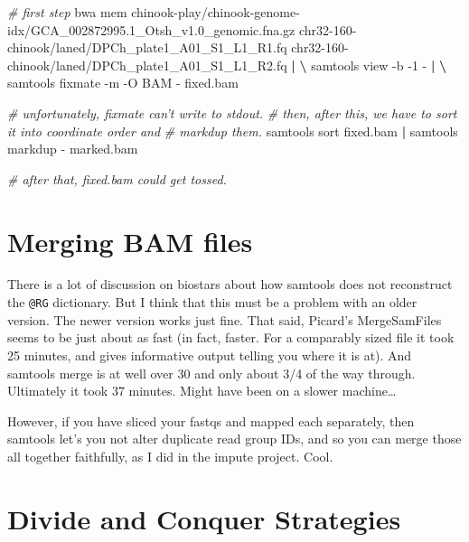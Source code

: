 \documentclass[]{krantz}
\makeatletter
\newenvironment{Shaded}{\begin{snugshade}}{\end{snugshade}}
\newcommand{\CommentTok}[1]{\textcolor[rgb]{0.37,0.37,0.37}{\textit{#1}}}
\newcommand{\ExtensionTok}[1]{#1}
\newcommand{\KeywordTok}[1]{\textcolor[rgb]{0.27,0.27,0.27}{\textbf{#1}}}
\newcommand{\NormalTok}[1]{#1}
\newenvironment{kframe}{%
\medskip{}
\setlength{\fboxsep}{.8em}
 \def\at@end@of@kframe{}%
 \ifinner\ifhmode%
  \def\at@end@of@kframe{\end{minipage}}%
  \begin{minipage}{\columnwidth}%
 \fi\fi%
 \def\FrameCommand##1{\hskip\@totalleftmargin \hskip-\fboxsep
 \colorbox{shadecolor}{##1}\hskip-\fboxsep
     \hskip-\linewidth \hskip-\@totalleftmargin \hskip\columnwidth}%
 \MakeFramed {\advance\hsize-\width
   \@totalleftmargin\z@ \linewidth\hsize
   \@setminipage}}%
 {\par\unskip\endMakeFramed%
 \at@end@of@kframe}
\renewenvironment{Shaded}{\begin{kframe}}{\end{kframe}}
\makeatother
\begin{document}
\begin{Shaded}
\begin{Highlighting}[]
\CommentTok{# first step}
\ExtensionTok{bwa}\NormalTok{ mem chinook-play/chinook-genome-idx/GCA_002872995.1_Otsh_v1.0_genomic.fna.gz chr32-160-chinook/laned/DPCh_plate1_A01_S1_L1_R1.fq chr32-160-chinook/laned/DPCh_plate1_A01_S1_L1_R2.fq }\KeywordTok{|} \KeywordTok{\textbackslash{}}
    \ExtensionTok{samtools}\NormalTok{ view -b -1 - }\KeywordTok{|} \KeywordTok{\textbackslash{}}
    \ExtensionTok{samtools}\NormalTok{ fixmate -m -O BAM - fixed.bam}
    
\CommentTok{# unfortunately, fixmate can't write to stdout.}
\CommentTok{# then, after this, we have to sort it into coordinate order and}
\CommentTok{# markdup them.}
\ExtensionTok{samtools}\NormalTok{ sort fixed.bam }\KeywordTok{|} \ExtensionTok{samtools}\NormalTok{ markdup - marked.bam}

\CommentTok{# after that, fixed.bam could get tossed.}
\end{Highlighting}
\end{Shaded}

\hypertarget{merging-bam-files}{%
\section{Merging BAM files}\label{merging-bam-files}}

There is a lot of discussion on biostars about how samtools does not reconstruct the
\texttt{@RG} dictionary. But I think that this must be a problem with an older version. The
newer version works just fine. That said, Picard's MergeSamFiles seems to be just about
as fast (in fact, faster. For a comparably sized file it took 25 minutes, and gives informative
output telling you where it is at). And samtools merge is at well over 30 and only about
3/4 of the way through. Ultimately it took 37 minutes. Might have been on a slower machine\ldots{}

However, if you have sliced your fastqs and mapped each separately, then
samtools let's you not alter duplicate read group IDs, and so you can merge
those all together faithfully, as I did in the impute project. Cool.

\hypertarget{divide-and-conquer-strategies}{%
\section{Divide and Conquer Strategies}\label{divide-and-conquer-strategies}}
\end{document}
